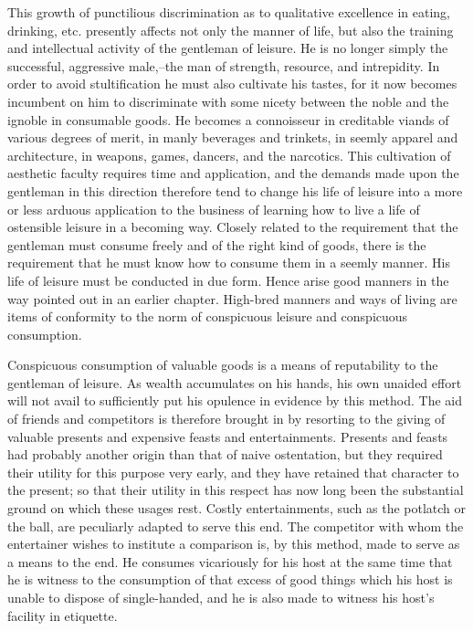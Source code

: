 \documentclass[12pt]{report}
\begin{document}
This growth of punctilious discrimination as to qualitative excellence
in eating, drinking, etc. presently affects not only the manner of life,
but also the training and intellectual activity of the gentleman of
leisure. He is no longer simply the successful, aggressive male,--the
man of strength, resource, and intrepidity. In order to avoid
stultification he must also cultivate his tastes, for it now becomes
incumbent on him to discriminate with some nicety between the noble and
the ignoble in consumable goods. He becomes a connoisseur in creditable
viands of various degrees of merit, in manly beverages and trinkets,
in seemly apparel and architecture, in weapons, games, dancers, and
the narcotics. This cultivation of aesthetic faculty requires time and
application, and the demands made upon the gentleman in this direction
therefore tend to change his life of leisure into a more or less arduous
application to the business of learning how to live a life of ostensible
leisure in a becoming way. Closely related to the requirement that the
gentleman must consume freely and of the right kind of goods, there
is the requirement that he must know how to consume them in a seemly
manner. His life of leisure must be conducted in due form. Hence arise
good manners in the way pointed out in an earlier chapter. High-bred
manners and ways of living are items of conformity to the norm of
conspicuous leisure and conspicuous consumption.

Conspicuous consumption of valuable goods is a means of reputability to
the gentleman of leisure. As wealth accumulates on his hands, his
own unaided effort will not avail to sufficiently put his opulence in
evidence by this method. The aid of friends and competitors is therefore
brought in by resorting to the giving of valuable presents and expensive
feasts and entertainments. Presents and feasts had probably another
origin than that of naive ostentation, but they required their utility
for this purpose very early, and they have retained that character to
the present; so that their utility in this respect has now long been the
substantial ground on which these usages rest. Costly entertainments,
such as the potlatch or the ball, are peculiarly adapted to serve this
end. The competitor with whom the entertainer wishes to institute a
comparison is, by this method, made to serve as a means to the end. He
consumes vicariously for his host at the same time that he is witness to
the consumption of that excess of good things which his host is unable
to dispose of single-handed, and he is also made to witness his host's
facility in etiquette.
\end{document}
